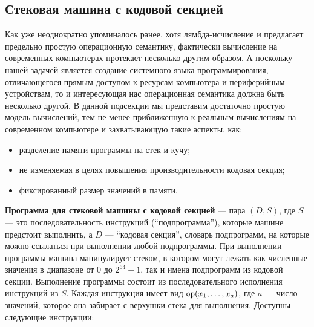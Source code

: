 \documentclass[12pt]{article}
\begin{document}
\subsection{Стековая машина с кодовой секцией}

Как уже неоднократно упоминалось ранее, хотя лямбда-исчисление и предлагает
предельно простую операционную семантику, фактически вычисление на современных
компьютерах протекает несколько другим образом. А поскольку нашей задачей
является создание системного языка программирования, отличающегося прямым
доступом к ресурсам компьютера и периферийным устройствам, то и интересующая нас
операционная семантика должна быть несколько другой. В данной подсекции мы
представим достаточно простую модель вычислений, тем не менее приближенную
к реальным вычислениям на современном компьютере и захватывающую такие аспекты,
как:

\begin{itemize}
  \item разделение памяти программы на стек и кучу;
  \item не изменяемая в целях повышения производительности кодовая секция;
  \item фиксированный размер значений в памяти.
\end{itemize}

\textbf{Программа для стековой машины с кодовой секцией} --- пара $(D, S)$, где
$S$ --- это последовательность инструкций (``подпрограмма''), которые машине
предстоит выполнить, а $D$ --- ``кодовая секция'', словарь подпрограмм, на
которые можно ссылаться при выполнении любой подпрограммы. При выполнении
программы машина манипулирует стеком, в котором могут лежать как численные
значения в диапазоне от $0$ до $2^{64} - 1$, так и имена подпрограмм из кодовой
секции. Выполнение программы состоит из последовательного исполнения инструкций
из $S$. Каждая инструкция имеет вид $\verb|op|(x_1,\ldots,x_a)$, где $a$ ---
число значений, которое она забирает с верхушки стека для выполнения. Доступны
следующие инструкции:
\end{document}
